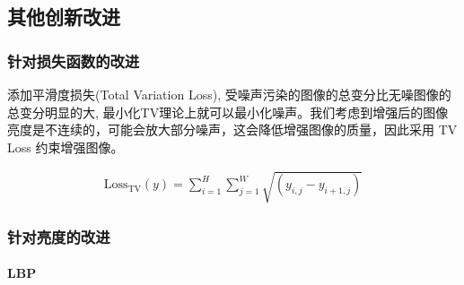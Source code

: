 \documentclass[a4paper]{ctexart}
\begin{document}
	\subsection{其他创新改进}
	
	
	
	\subsubsection{针对损失函数的改进}
	
	添加平滑度损失(Total Variation Loss)\cite{rudin1992nonlinear}, 受噪声污染的图像的总变分比无噪图像的总变分明显的大, 最小化TV理论上就可以最小化噪声。我们考虑到增强后的图像亮度是不连续的，可能会放大部分噪声，这会降低增强图像的质量，因此采用 TV Loss 约束增强图像。
	
	\begin{equation}
		\begin{aligned}
			\text{Loss}_{\text{TV}} \left( y \right) = \sum_{i=1}^{H} \sum_{j=1}^{W}\sqrt{\left(y_{i,j} - y_{i+1, j}\right)}			
		\end{aligned}
		\label{eq: TV loss}
	\end{equation}
	
	\FloatBarrier
	
	\subsubsection{针对亮度的改进}
	
	\paragraph{LBP}
	
\end{document}
